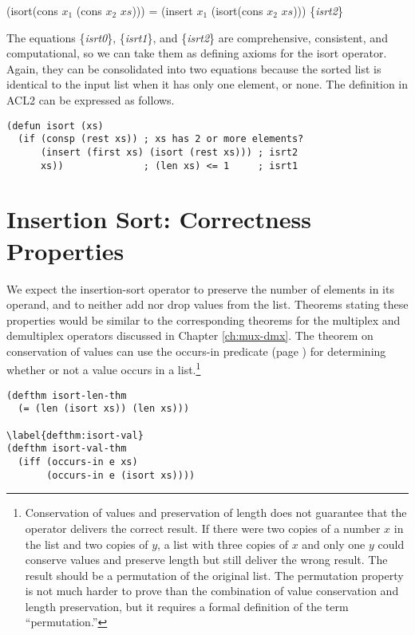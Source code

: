 \label{eq:isrt2}
\hspace{1cm} (isort(cons $x_1$ (cons $x_2$ $xs$))) =
(insert $x_1$ (isort(cons $x_2$ $xs$)))  \hfill \{\emph{isrt2}\}

The equations \{\emph{isrt0}\}, \{\emph{isrt1}\}, and \{\emph{isrt2}\}
are comprehensive, consistent, and computational,
so we can take them as defining axioms for the isort operator.
Again, they can be consolidated into two equations because
the sorted list is identical to the input list when it has
only one element, or none.
The definition in ACL2 can be expressed as follows.

\label{defun:isort}
\begin{Verbatim}
(defun isort (xs)
  (if (consp (rest xs)) ; xs has 2 or more elements?
      (insert (first xs) (isort (rest xs))) ; isrt2
      xs))              ; (len xs) <= 1     ; isrt1
\end{Verbatim}

\section{Insertion Sort: Correctness Properties}
\label{sec:insertion-sort-correctness}

We expect the insertion-sort operator to preserve
the number of elements in its operand, and to
neither add nor drop values from the list.
Theorems stating these properties would be
similar to the corresponding theorems for
the multiplex and demultiplex operators discussed
in Chapter \ref{ch:mux-dmx}.
The theorem on conservation of values
can use the occurs-in predicate
(page \pageref{def:occurs-in}) for determining
whether or not a value occurs in a list.\footnote{Conservation
of values and preservation of length does not guarantee
that the operator delivers the correct result.
If there were two copies of a number $x$ in the list
and two copies of $y$, a list with three copies of $x$
and only one $y$ could conserve values and preserve
length but still deliver the wrong result.
The result should be a permutation of the original list.
The permutation property is not much harder
to prove than the combination of value conservation and length preservation,
but it requires a formal definition of the term ``permutation.''}

\label{defthm:isort-len}
\begin{Verbatim}
(defthm isort-len-thm
  (= (len (isort xs)) (len xs)))

\label{defthm:isort-val}
(defthm isort-val-thm
  (iff (occurs-in e xs)
       (occurs-in e (isort xs))))
\end{Verbatim}

